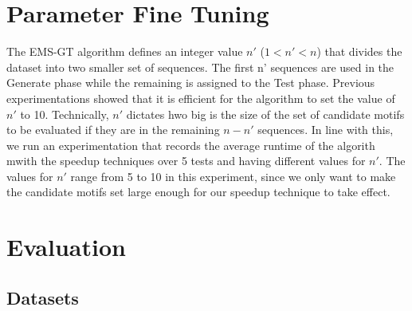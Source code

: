 
\section{Parameter Fine Tuning}
The EMS-GT algorithm defines an integer value $n'$ ($1 < n' < n$) that divides the dataset into two smaller set of sequences. The first n' sequences are used in the Generate phase while the remaining is assigned to the Test phase. Previous experimentations \cite{sia2015} showed that it is efficient for the algorithm to set the value of $n'$ to 10. Technically, $n'$ dictates hwo big is the size of the set of candidate motifs  to be evaluated if they are in the remaining $n - n'$ sequences. In line with this, we run an experimentation that records the average runtime of the algorith mwith the speedup techniques over 5 tests and having different values for $n'$. The values for $n'$ range from 5 to 10 in this experiment, since we only want to make the candidate motifs set large enough for our speedup technique to take effect.

\section{Evaluation}


\subsection{Datasets}


